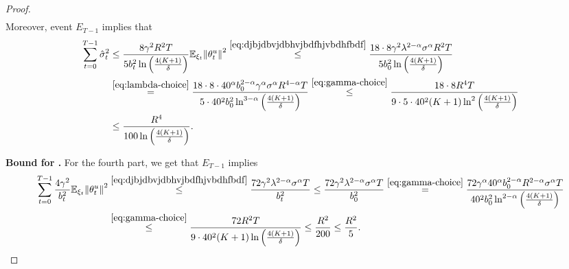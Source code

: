 \documentclass{article}
\begin{document}
\begin{proof}
\begin{align*}
    \end{align*}
    Moreover, event $E_{T-1}$ implies that
    \begin{align*}
        \sum\limits_{t=0}^{T-1} \hat{\sigma}_t^2 &\leq \frac{8\gamma^2R^2T}{5b_t^2\ln\left(\frac{4(K+1)}{\delta}\right)}{\mathbb E}_{\xi_t}{\left\lVert\theta_t^u\right\rVert}^2 \overset{\eqref{eq:djbjdbvjdbhvjbdfhjvbdhfbdf}}{\leq} \frac{18 \cdot 8\gamma^2\lambda^{2 - \alpha}\sigma^{\alpha}R^2T}{5b_0^2\ln\left(\frac{4(K+1)}{\delta}\right)} \\
        & \overset{\eqref{eq:lambda-choice}}{=} \frac{18 \cdot 8 \cdot 40^\alpha b_0^{2-\alpha}\gamma^\alpha \sigma^{\alpha}R^{4 - \alpha}T}{5\cdot 40^2b_0^2\ln^{3 - \alpha}\left(\frac{4(K+1)}{\delta}\right)} \overset{\eqref{eq:gamma-choice}}{\leq} \frac{18 \cdot 8 R^{4}T}{9 \cdot 5\cdot 40^2(K+1)\ln^{2}\left(\frac{4(K+1)}{\delta}\right)} \\&\leq \frac{R^{4}}{100\ln\left(\frac{4(K+1)}{\delta}\right)}.
    \end{align*}

    
    \textbf{Bound for \circledFour.} For the fourth part, we get that $E_{T-1}$ implies
    \begin{align*}
         \sum\limits_{t=0}^{T-1} \frac{4\gamma^2}{b_t^2}{\mathbb E}_{\xi_t}{\left\lVert\theta_t^u\right\rVert}^2 & \overset{\eqref{eq:djbjdbvjdbhvjbdfhjvbdhfbdf}}{\leq} \frac{72\gamma^2\lambda^{2 - \alpha}\sigma^\alpha T}{b_t^2} \leq \frac{72\gamma^2\lambda^{2 - \alpha}\sigma^\alpha T}{b_0^2} \overset{\eqref{eq:gamma-choice}}{=} \frac{72\gamma^\alpha 40^\alpha b_0^{2 - \alpha}R^{2 - \alpha}\sigma^\alpha T}{40^2b_0^2 \ln^{2 - \alpha}\left(\frac{4(K+1)}{\delta}\right)} \\
         &\overset{\eqref{eq:gamma-choice}}{\leq} \frac{72 R^{2}T}{9 \cdot 40^2(K+1) \ln\left(\frac{4(K+1)}{\delta}\right)} \leq  \frac{R^{2}}{200} \leq \frac{R^2}{5}.
    \end{align*}


\end{proof}
\end{document}
